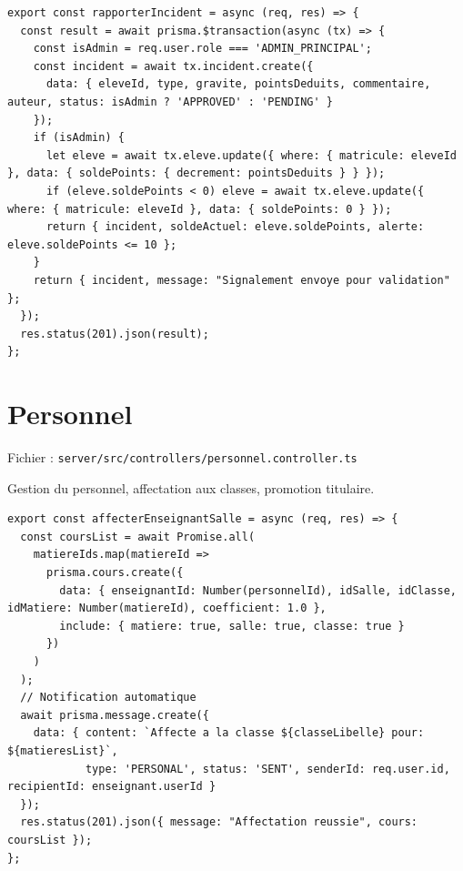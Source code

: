 \documentclass[12pt,a4paper]{article}
\begin{document}
\begin{lstlisting}[style=code]
export const rapporterIncident = async (req, res) => {
  const result = await prisma.$transaction(async (tx) => {
    const isAdmin = req.user.role === 'ADMIN_PRINCIPAL';
    const incident = await tx.incident.create({
      data: { eleveId, type, gravite, pointsDeduits, commentaire, auteur, status: isAdmin ? 'APPROVED' : 'PENDING' }
    });
    if (isAdmin) {
      let eleve = await tx.eleve.update({ where: { matricule: eleveId }, data: { soldePoints: { decrement: pointsDeduits } } });
      if (eleve.soldePoints < 0) eleve = await tx.eleve.update({ where: { matricule: eleveId }, data: { soldePoints: 0 } });
      return { incident, soldeActuel: eleve.soldePoints, alerte: eleve.soldePoints <= 10 };
    }
    return { incident, message: "Signalement envoye pour validation" };
  });
  res.status(201).json(result);
};
\end{lstlisting}

\newpage

\section{Personnel}

Fichier : \texttt{server/src/controllers/personnel.controller.ts}

Gestion du personnel, affectation aux classes, promotion titulaire.

\begin{lstlisting}[style=code]
export const affecterEnseignantSalle = async (req, res) => {
  const coursList = await Promise.all(
    matiereIds.map(matiereId =>
      prisma.cours.create({
        data: { enseignantId: Number(personnelId), idSalle, idClasse, idMatiere: Number(matiereId), coefficient: 1.0 },
        include: { matiere: true, salle: true, classe: true }
      })
    )
  );
  // Notification automatique
  await prisma.message.create({
    data: { content: `Affecte a la classe ${classeLibelle} pour: ${matieresList}`,
            type: 'PERSONAL', status: 'SENT', senderId: req.user.id, recipientId: enseignant.userId }
  });
  res.status(201).json({ message: "Affectation reussie", cours: coursList });
};
\end{lstlisting}

\newpage

\end{document}
